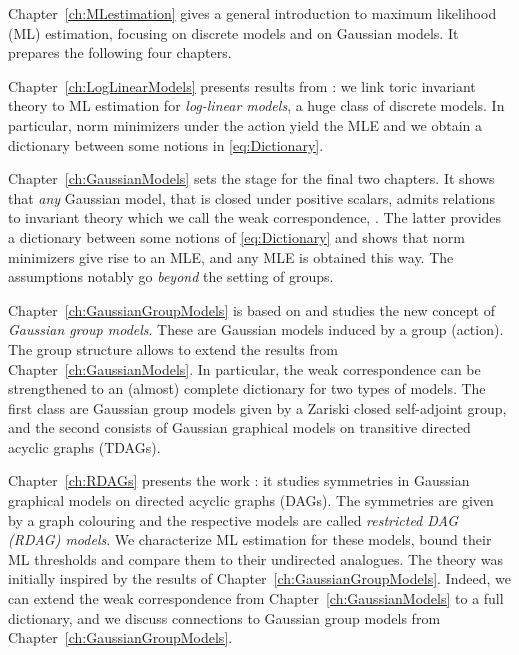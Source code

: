 \bigskip

Chapter~\ref{ch:MLestimation} gives a general introduction to maximum likelihood (ML) estimation, focusing on discrete models and on Gaussian models. It prepares the following four chapters.

Chapter~\ref{ch:LogLinearModels} presents results from \cite{DiscretePaper}: we link toric invariant theory to ML estimation for \emph{log-linear models}, a huge class of discrete models. In particular, norm minimizers under the action yield the MLE and we obtain a dictionary between some notions in \eqref{eq:Dictionary}.

Chapter~\ref{ch:GaussianModels} sets the stage for the final two chapters. It shows that \emph{any} Gaussian model, that is closed under positive scalars, admits relations to invariant theory which we call the weak correspondence, \cite{RDAG}. The latter provides a dictionary between some notions of \eqref{eq:Dictionary} and shows that norm minimizers give rise to an MLE, and any MLE is obtained this way. The assumptions notably go \emph{beyond} the setting of groups.

Chapter~\ref{ch:GaussianGroupModels} is based on \cite{SiagaPaper} and studies the new concept of \emph{Gaussian group models}. These are Gaussian models induced by a group (action). The group structure allows to extend the results from Chapter~\ref{ch:GaussianModels}. In particular, the weak correspondence can be strengthened to an (almost) complete dictionary for two types of models. The first class are Gaussian group models given by a Zariski closed self-adjoint group, and the second consists of Gaussian graphical models on transitive directed acyclic graphs (TDAGs).

Chapter~\ref{ch:RDAGs} presents the work \cite{RDAG}: it studies symmetries in Gaussian graphical models on directed acyclic graphs (DAGs). The symmetries are given by a graph colouring and the respective models are called \emph{restricted DAG (RDAG) models}. We characterize ML estimation for these models, bound their ML thresholds and compare them to their undirected analogues. The theory was initially inspired by the results of Chapter~\ref{ch:GaussianGroupModels}. Indeed, we can extend the weak correspondence from Chapter~\ref{ch:GaussianModels} to a full dictionary, and we discuss connections to Gaussian group models from Chapter~\ref{ch:GaussianGroupModels}.





{}
